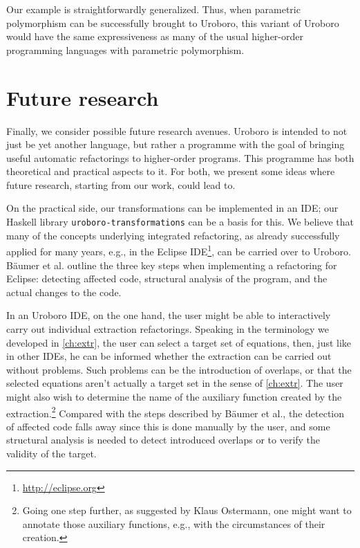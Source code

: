 Our example is straightforwardly generalized. Thus, when parametric polymorphism can be successfully brought to Uroboro, this variant of Uroboro would have the same expressiveness as many of the usual higher-order programming languages with parametric polymorphism.

\section{Future research}
\label{sec:futr}

Finally, we consider possible future research avenues. Uroboro is intended to not just be yet another language, but rather a programme with the goal of bringing useful automatic refactorings to higher-order programs. This programme has both theoretical and practical aspects to it. For both, we present some ideas where future research, starting from our work, could lead to.

On the practical side, our transformations can be implemented in an IDE; our Haskell library \texttt{uroboro-transformations} can be a basis for this. We believe that many of the concepts underlying integrated refactoring, as already successfully applied for many years, e.g., in the Eclipse IDE\footnote{\url{http://eclipse.org}}, can be carried over to Uroboro. Bäumer et al.\cite{baumer2001integrating} outline the three key steps when implementing a refactoring for Eclipse: detecting affected code, structural analysis of the program, and the actual changes to the code.

In an Uroboro IDE, on the one hand, the user might be able to interactively carry out individual extraction refactorings. Speaking in the terminology we developed in \autoref{ch:extr}, the user can select a target set of equations, then, just like in other IDEs, he can be informed whether the extraction can be carried out without problems. Such problems can be the introduction of overlaps, or that the selected equations aren't actually a target set in the sense of \autoref{ch:extr}. The user might also wish to determine the name of the auxiliary function created by the extraction.\footnote{Going one step further, as suggested by Klaus Ostermann, one might want to annotate those auxiliary functions, e.g., with the circumstances of their creation.} Compared with the steps described by Bäumer et al., the detection of affected code falls away since this is done manually by the user, and some structural analysis is needed to detect introduced overlaps or to verify the validity of the target.

